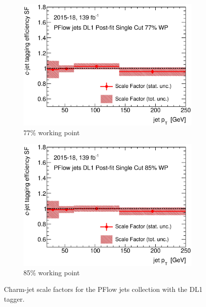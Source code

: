 \documentclass[letterpaper,12pt]{article}
\begin{document}
\begin{figure}[H]
\begin{subfigure}[t]{.35\linewidth}
		\includegraphics[width=1\textwidth]{FTAG_plots/DL1allPFlowDec/SF77.eps}
		\caption{77\% working point}
		\end{subfigure}
		\begin{subfigure}[t]{.35\linewidth}
		\includegraphics[width=1\textwidth]{FTAG_plots/DL1allPFlowDec/SF85.eps}
		\caption{85\% working point}
		\end{subfigure}
	\caption{Charm-jet scale factors for the PFlow jets collection with 
	the DL1 tagger.} \label{fig:Dec_SF_PFlow_DL1}
	\end{figure}
	
\end{document}
